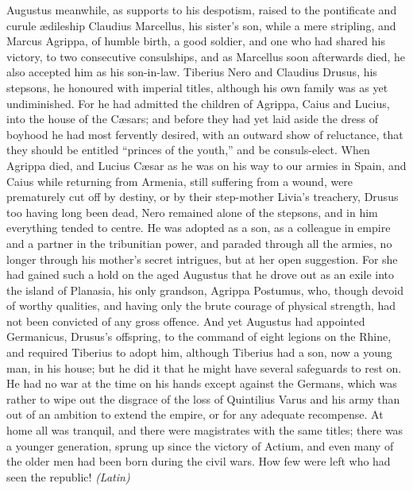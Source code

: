 
Augustus meanwhile, as supports to his despotism, raised to the pontificate and curule ædileship Claudius Marcellus, his sister's son, while a mere stripling, and Marcus Agrippa, of humble birth, a good soldier, and one who had shared his victory, to two consecutive consulships, and as Marcellus soon afterwards died, he also accepted him as his son-in-law. Tiberius Nero and Claudius Drusus, his stepsons, he honoured with imperial titles, although his own family was as yet undiminished. For he had admitted the children of Agrippa, Caius and Lucius, into the house of the Cæsars; and before they had yet laid aside the dress of boyhood he had most fervently desired, with an outward show of reluctance, that they should be entitled ``princes of the youth,'' and be consuls-elect. When Agrippa died, and Lucius Cæsar as he was on his way to our armies in Spain, and Caius while returning from Armenia, still suffering from a wound, were prematurely cut off by destiny, or by their step-mother Livia's treachery, Drusus too having long been dead, Nero remained alone of the stepsons, and in him everything tended to centre. He was adopted as a son, as a colleague in empire and a partner in the tribunitian power, and paraded through all the armies, no longer through his mother's secret intrigues, but at her open suggestion. For she had gained such a hold on the aged Augustus that he drove out as an exile into the island of Planasia, his only grandson, Agrippa Postumus, who, though devoid of worthy qualities, and having only the brute courage of physical strength, had not been convicted of any gross offence. And yet Augustus had appointed Germanicus, Drusus's offspring, to the command of eight legions on the Rhine, and required Tiberius to adopt him, although Tiberius had a son, now a young man, in his house; but he did it that he might have several safeguards to rest on. He had no war at the time on his hands except against the Germans, which was rather to wipe out the disgrace of the loss of Quintilius Varus and his army than out of an ambition to extend the empire, or for any adequate recompense. At home all was tranquil, and there were magistrates with the same titles; there was a younger generation, sprung up since the victory of Actium, and even many of the older men had been born during the civil wars. How few were left who had seen the republic! \emph{(Latin)}


